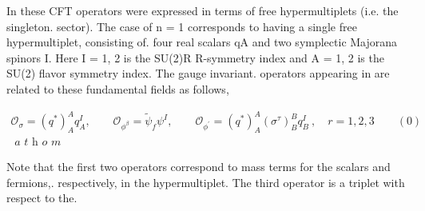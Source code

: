 \documentclass{article}
\begin{document}
In these CFT operators were expressed in terms of free hypermultiplets (i.e. the singleton.
sector). The case of n = 1 corresponds to having a single free hypermultiplet, consisting of.
four real scalars qA and two symplectic Majorana spinors I. Here I = 1, 2 is the SU(2)R
R-symmetry index and A = 1, 2 is the SU(2) flavor symmetry index. The gauge invariant.
operators appearing in are related to these fundamental fields as follows,


\begin{equation}
\begin{array} { r } { \mathcal { O } _ { \sigma } = ( q ^ { * } ) _ { A } ^ { A } q _ { A } ^ { I }, \qquad \mathcal { O } _ { \phi ^ { \beta } } = \tilde { \psi } _ { f } \psi ^ { I }, \qquad \mathcal { O } _ { \phi ^ { \prime } } = \left ( q ^ { * } \right ) _ { A } ^ { A } \! \left ( \sigma ^ { \tau } \right ) _ { B } ^ { B } q _ { B } ^ { I } ~, \quad r = 1, 2, 3 \qquad ( 0 ) } \\ { \textit { a t h o m}}\end{array}
\end{equation}


Note that the first two operators correspond to mass terms for the scalars and fermions,.
respectively, in the hypermultiplet. The third operator is a triplet with respect to the.
\end{document}
